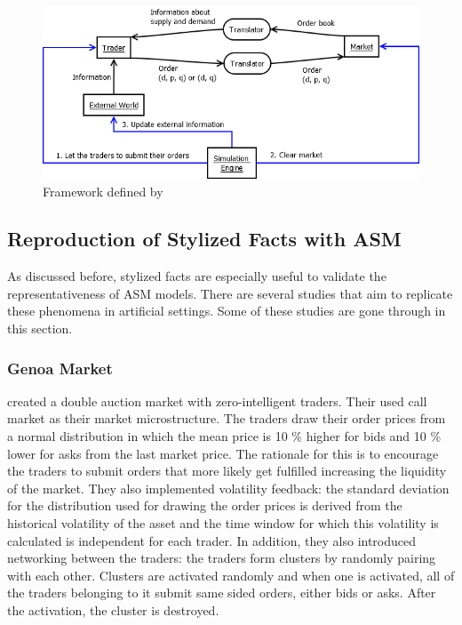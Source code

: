 \begin{figure}[H]
    \includegraphics[width=\linewidth]{diagrams/julien_market.png}
    \caption{Framework defined by \citet{Julien07}}
\end{figure}


\subsection{Reproduction of Stylized Facts with ASM}
As discussed before, stylized facts are especially useful
to validate the representativeness of ASM models. There are several 
studies that aim to replicate these phenomena in 
artificial settings. Some of these studies are
gone through in this section.
% 
\subsubsection{Genoa Market}

\citet{Genoa01} created a double auction market with zero-intelligent 
traders. Their used call market as their market microstructure. The traders draw their 
order prices from a normal distribution in which the mean price is 10 \%
higher for bids and 10 \% lower for asks from the last market price. The
rationale for this is to encourage the traders to submit orders that more likely get 
fulfilled increasing the liquidity of the market.
They also implemented volatility feedback: the standard deviation for 
the distribution used for drawing the order prices is derived from the 
historical volatility of the asset and the time window for which this
volatility is calculated is independent for each trader. In addition,
they also introduced networking between the traders: the traders
form clusters by randomly pairing with each other. Clusters are activated
randomly and when one is activated, all of the traders belonging to it
submit same sided orders, either bids or asks. After the activation, the cluster is destroyed.

